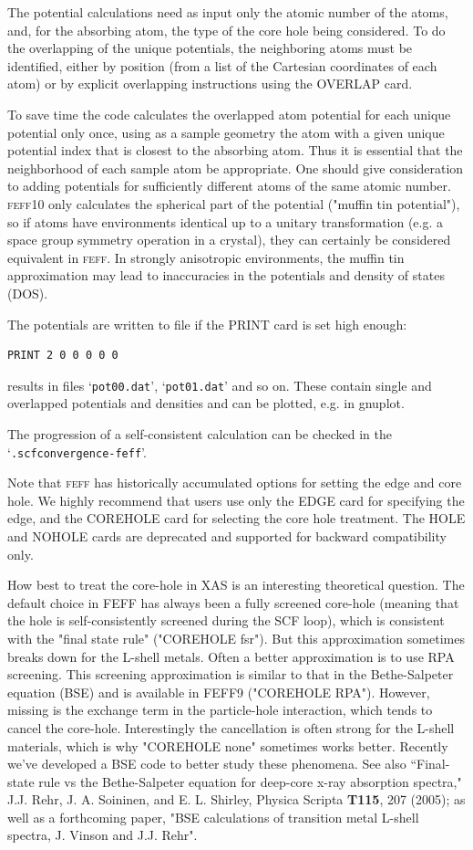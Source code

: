 \documentclass[11pt,oneside]{report} %
\newcommand{\program}[1]{\textsc{#1}}
\newcommand{\feff}{\program{feff}}
\newcommand{\vnum}{10}
\newcommand{\feffcur}{\feff\vnum}
\newcommand{\file}[1]{`\texttt{#1}'}
\begin{document}
The potential calculations need as input only the atomic number of the
atoms, and, for the absorbing atom, the type of the core hole being
considered. To do the overlapping of the unique potentials, the
neighboring atoms must be identified, either by position (from a list
of the Cartesian coordinates of each atom) or by explicit overlapping
instructions using the OVERLAP card.

To save time the code calculates the overlapped atom potential for each
unique potential only once, using as a sample geometry the atom with
a given unique potential index that is closest to the absorbing atom. 
Thus it is essential that the neighborhood of each sample atom be appropriate.
One should give consideration to adding potentials for sufficiently different atoms
of the same atomic number.  {\feffcur} only calculates the spherical part of the potential
("muffin tin potential"), so if atoms have environments identical up to a unitary transformation
(e.g. a space group symmetry operation in a crystal), they can certainly be considered equivalent
in {\feff}.  In strongly anisotropic environments, the muffin tin approximation may lead
to inaccuracies in the potentials and density of states (DOS). 

The potentials are written to file if the PRINT card is set high enough:
\begin{verbatim}
PRINT 2 0 0 0 0 0 
\end{verbatim}
results in files \file{pot00.dat}, \file{pot01.dat} and so on.  These contain single and overlapped potentials
and densities and can be plotted, e.g. in gnuplot.

The progression of a self-consistent calculation can be checked in the \file{.scfconvergence-feff}.

Note that {\feff} has historically accumulated options for setting the
edge and core hole.  We highly recommend that users use only the EDGE card for
specifying the edge, and the COREHOLE card for selecting the core hole treatment.
The HOLE and NOHOLE cards are deprecated and supported for backward compatibility only.

How best to treat the core-hole in XAS is an interesting theoretical question. The default choice in FEFF has always been a fully screened core-hole (meaning that the hole is self-consistently screened during the SCF loop), which is consistent with the "final state rule" ("COREHOLE fsr"). But this approximation sometimes breaks down for the L-shell metals. Often a better approximation is to use RPA screening.  This screening approximation is similar to that in the Bethe-Salpeter equation (BSE) and is available in FEFF9 ("COREHOLE RPA"). However, missing is the exchange term in the particle-hole interaction, which tends to cancel the core-hole. Interestingly the cancellation is often strong for the L-shell materials, which is why "COREHOLE none" sometimes works better. Recently we've developed a BSE code to better study these phenomena. See also ``Final-state rule vs the Bethe-Salpeter equation  for deep-core x-ray absorption spectra," J.J. Rehr, J. A. Soininen, and E. L. Shirley, Physica Scripta {\bf T115}, 207 (2005); as well as a forthcoming paper, "BSE calculations of transition metal L-shell spectra, J. Vinson and J.J. Rehr".
\end{document}
